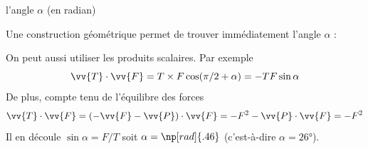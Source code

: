 
\begin{enonce}
l'angle $\alpha$ (en radian)
\end{enonce}


\begin{corrige}
	Une construction géométrique permet de trouver immédiatement l'angle $\alpha$ : 
	\begin{center}
	\end{center}
	On peut aussi utiliser les produits scalaires. Par exemple 
	\[
		\vv{T}\cdot \vv{F}=T\times F\cos(\pi/2+\alpha)=-TF\sin\alpha
	\]
	De plus, compte tenu de l'équilibre des forces 
	\[
		\vv{T}\cdot \vv{F}=
		(-\vv{F}-\vv{P})\cdot \vv{F}=
		-F^2-\vv{P}\cdot \vv{F}=-F^2
	\]
	Il en découle $\sin\alpha=F/T$ soit $\alpha=\np[rad]{.46}$ (c'est-à-dire $\alpha=\ang{26}$).
\end{corrige}


\finEntrainement










\hauteurLargeurCadreReponse		{6mm}{3cm}
\typeEntrainement				{} %
\initialisationEntrainement


